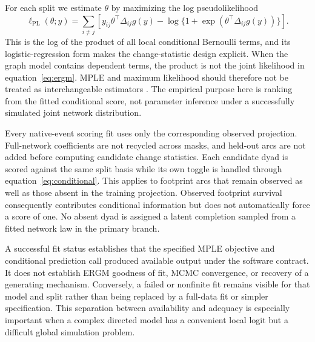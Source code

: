 \documentclass[10pt]{article}
\begin{document}
For each split we estimate $\theta$ by maximizing the log pseudolikelihood
\begin{equation}
\ell_{\mathrm{PL}}(\theta;y)=\sum_{i\ne j}
\left[y_{ij}\theta^\top\Delta_{ij}g(y)
-\log\{1+\exp(\theta^\top\Delta_{ij}g(y))\}\right].
\label{eq:mple}
\end{equation}
This is the log of the product of all local conditional Bernoulli terms, and its logistic-regression form makes the change-statistic design explicit. When the graph model contains dependent terms, the product is not the joint likelihood in equation~\eqref{eq:ergm}. MPLE and maximum likelihood should therefore not be treated as interchangeable estimators \citep{vanDuijnEtAl2009}. The empirical purpose here is ranking from the fitted conditional score, not parameter inference under a successfully simulated joint network distribution.

Every native-event scoring fit uses only the corresponding observed projection. Full-network coefficients are not recycled across masks, and held-out arcs are not added before computing candidate change statistics. Each candidate dyad is scored against the same split basis while its own toggle is handled through equation~\eqref{eq:conditional}. This applies to footprint arcs that remain observed as well as those absent in the training projection. Observed footprint survival consequently contributes conditional information but does not automatically force a score of one. No absent dyad is assigned a latent completion sampled from a fitted network law in the primary branch.

A successful fit status establishes that the specified MPLE objective and conditional prediction call produced available output under the software contract. It does not establish ERGM goodness of fit, MCMC convergence, or recovery of a generating mechanism. Conversely, a failed or nonfinite fit remains visible for that model and split rather than being replaced by a full-data fit or simpler specification. This separation between availability and adequacy is especially important when a complex directed model has a convenient local logit but a difficult global simulation problem.
\end{document}
